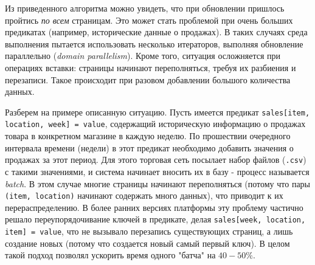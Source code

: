 Из приведенного алгоритма можно увидеть, что при обновлении пришлось пройтись \emph{по всем} страницам. Это может стать проблемой при очень больших предикатах (например, исторические данные о продажах). В таких случаях среда выполнения пытается использовать несколько итераторов, выполняя обновление параллельно (\emph{domain parallelism}). Кроме того, ситуация осложняется при операциях вставки: страницы начинают переполняться, требуя их разбиения и перезаписи. Такое происходит при разовом добавлении большого количества данных.

Разберем на примере описанную ситуацию. Пусть имеется предикат \lstinline{sales[item, location, week] = value}, содержащий историческую информацию о продажах товара в конкретном магазине в каждую неделю. По прошествии очередного интервала времени (недели) в этот предикат необходимо добавить значения о продажах за этот период. Для этого торговая сеть посылает набор файлов (\lstinline{.csv}) с такими значениями, и система начинает вносить их в базу - процесс называется \emph{batch}. В этом случае многие страницы начинают переполняться (потому что пары \lstinline{(item, location)} начинают содержать много данных), что приводит к их перераспределению. В более ранних версиях платформы эту проблему частично решало переупорядочивание ключей в предикате, делая \lstinline{sales[week, location, item] = value}, что не вызывало перезапись существующих страниц, а лишь создание новых (потому что создается новый самый первый ключ). В целом такой подход позволял ускорить время одного "батча" на $40-50\%$.
